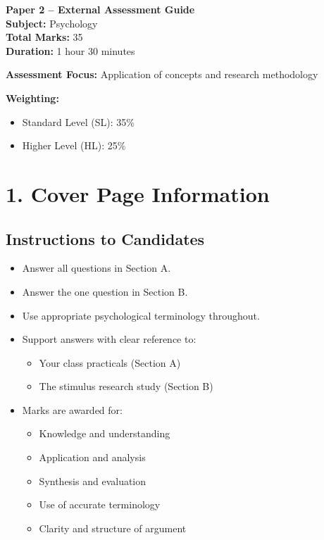 \documentclass[12pt,a4paper]{article}
\begin{document}
\begin{center}
    {\LARGE \textbf{Paper 2 – External Assessment Guide}} \\
    \vspace{0.5em}
    \textbf{Subject:} Psychology \\
    \textbf{Total Marks:} 35 \\
    \textbf{Duration:} 1 hour 30 minutes
\end{center}

\vspace{1em}

\textbf{Assessment Focus:} Application of concepts and research methodology  

\textbf{Weighting:}
\begin{itemize}
    \item Standard Level (SL): 35\%
    \item Higher Level (HL): 25\%
\end{itemize}

\section*{1. Cover Page Information}

\subsection*{Instructions to Candidates}

\begin{itemize}
    \item Answer all questions in Section A.
    \item Answer the one question in Section B.
    \item Use appropriate psychological terminology throughout.
    \item Support answers with clear reference to:
    \begin{itemize}
        \item Your class practicals (Section A)
        \item The stimulus research study (Section B)
    \end{itemize}
    \item Marks are awarded for:
    \begin{itemize}
        \item Knowledge and understanding
        \item Application and analysis
        \item Synthesis and evaluation
        \item Use of accurate terminology
        \item Clarity and structure of argument
    \end{itemize}
\end{itemize}
\end{document}
